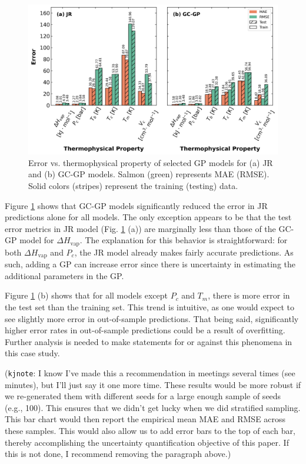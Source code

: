 \documentclass[journal=jacsat,manuscript=article]{achemso}
\newcommand{\kjnote}[1]{{\color{Blue} (\texttt{kjnote}: #1)}}
\begin{document}
\begin{figure}
    \centering
    \includegraphics[width=\linewidth]{images/error_bar_chart_shared_yaxis.png}
    \caption{Error vs. thermophysical property of selected GP models for (a) JR and (b) GC-GP models. Salmon (green) represents MAE (RMSE). Solid colors (stripes) represent the training (testing) data.}
    \label{fig: errorbarchart}
\end{figure}

Figure \ref{fig: errorbarchart} shows that GC-GP models significantly reduced the error in JR predictions alone for all models. The only exception appears to be that the test error metrics in JR model (Fig. \ref{fig: errorbarchart} (a)) are marginally less than those of the GC-GP model for $\Delta H_{\text{vap}}$. The explanation for this behavior is straightforward: for both $\Delta H_{\text{vap}}$ and $P_c$, the JR model already makes fairly accurate predictions. As such, adding a GP can increase error since there is uncertainty in estimating the additional parameters in the GP. 

Figure \ref{fig: errorbarchart} (b) shows that for all models except $P_c$ and $T_m$, there is more error in the test set than the training set. This trend is intuitive, as one would expect to see slightly more error in out-of-sample predictions. That being said, significantly higher error rates in out-of-sample predictions could be a result of overfitting. Further analysis is needed to make statements for or against this phenomena in this case study.

\kjnote{I know I've made this a recommendation in meetings several times (see minutes), but I'll just say it one more time. These results would be more robust if we re-generated them with different seeds for a large enough sample of seeds (e.g., 100). This ensures that we didn't get lucky when we did stratified sampling. This bar chart would then report the empirical mean MAE and RMSE across these samples. This would also allow us to add error bars to the top of each bar, thereby accomplishing the uncertainty quantification objective of this paper. If this is not done, I recommend removing the paragraph above.}
\end{document}
